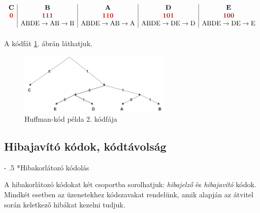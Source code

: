 \documentclass[12pt,margin=0px]{article}
\makeatletter
\renewcommand\paragraph{%
	\@startsection{paragraph}{4}{0mm}%
	{-\baselineskip}%
	{.5\baselineskip}%
	{\normalfont\normalsize\bfseries}}
\makeatother
\begin{document}
    \noindent $\begin{array}{c|c|c|c|c}
        \textbf{C} & \textbf{B} & \textbf{A} & \textbf{D} & \textbf{E} \\
        {\color[HTML]{CB0000} \textbf{0}} & {\color[HTML]{CB0000} \textbf{111}} & {\color[HTML]{CB0000} \textbf{110}} & {\color[HTML]{CB0000} \textbf{101}} & {\color[HTML]{CB0000} \textbf{100}} \\
        & \text{ABDE} \rightarrow \text{AB} \rightarrow \text{B} & \text{ABDE} \rightarrow \text{AB} \rightarrow \text{A} & \text{ABDE} \rightarrow \text{DE} \rightarrow \text{D} & \text{ABDE} \rightarrow \text{DE} \rightarrow \text{E} \\
    \end{array}$\\\\

    \noindent A kódfát \ref{fig:huffman_code_tree}. ábrán láthatjuk.\\

    \begin{figure}[H]
        \centering
        \includegraphics[width=0.65\textwidth]{img/huffman_code_tree.png}
        \caption{Huffman-kód példa 2. kódfája}
        \label{fig:huffman_code_tree}
    \end{figure}
			
\subsection*{Hibajavító kódok, kódtávolság\\}
			
    \paragraph*{Hibakorlátozó kódolás\\}

    A hibakorlátozó kódokat két csoportba sorolhatjuk: \emph{hibajelző} és \emph{hibajavító} kódok. \\
    Mindkét esetben az üzenetekhez kódszavakat rendelünk, amik alapján az átvitel során keletkező hibákat kezelni tudjuk.\\
\end{document}
